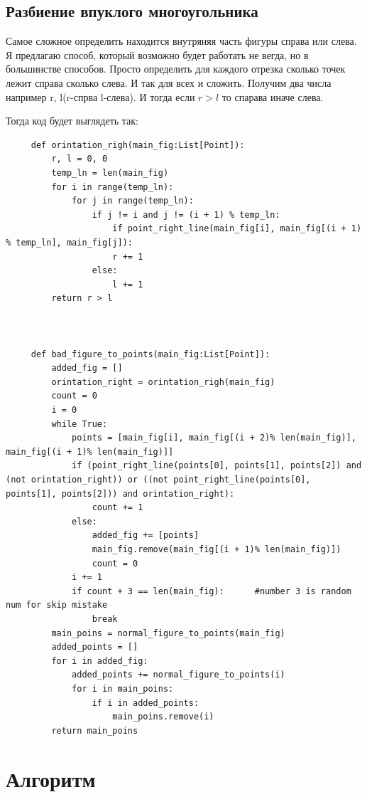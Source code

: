 \documentclass[12pt]{article} %
\begin{document}
 	 \subsection{Разбиение впуклого многоугольника}
 	 \hspace*{1cm}Самое сложное определить находится внутряняя часть фигуры справа или слева. Я предлагаю способ, который возможно будет работать не вегда, но в большинстве способов. Просто определить для каждого отрезка сколько точек лежит справа сколько слева. И так для всех и сложить. Получим два числа например r, l(r-спрва l-слева). И тогда если $r>l$ то спарава иначе слева. \par
 	 Тогда код будет выглядеть так:
 	 \begin{verbatim}
 	 def orintation_righ(main_fig:List[Point]):
 	     r, l = 0, 0
     	 temp_ln = len(main_fig)
 	     for i in range(temp_ln):
 	         for j in range(temp_ln):
 	             if j != i and j != (i + 1) % temp_ln:
 	                 if point_right_line(main_fig[i], main_fig[(i + 1) % temp_ln], main_fig[j]):
 	                 r += 1
 	             else:
 	                 l += 1
 	     return r > l
 	 
 	 
 	 
 	 def bad_figure_to_points(main_fig:List[Point]):
 	     added_fig = []
 	     orintation_right = orintation_righ(main_fig)
 	     count = 0
 	     i = 0
 	     while True:
 	         points = [main_fig[i], main_fig[(i + 2)% len(main_fig)], main_fig[(i + 1)% len(main_fig)]]
 	         if (point_right_line(points[0], points[1], points[2]) and (not orintation_right)) or ((not point_right_line(points[0], points[1], points[2])) and orintation_right):
 	             count += 1
 	         else:
 	             added_fig += [points]
 	             main_fig.remove(main_fig[(i + 1)% len(main_fig)])
 	             count = 0
 	         i += 1
 	         if count + 3 == len(main_fig):      #number 3 is random num for skip mistake
 	             break
 	     main_poins = normal_figure_to_points(main_fig)
 	     added_points = []
 	     for i in added_fig:
 	         added_points += normal_figure_to_points(i)
 	         for i in main_poins:
 	             if i in added_points:
 	                 main_poins.remove(i)
 	     return main_poins
 	\end{verbatim}
 	\section{Алгоритм}
\end{document}
